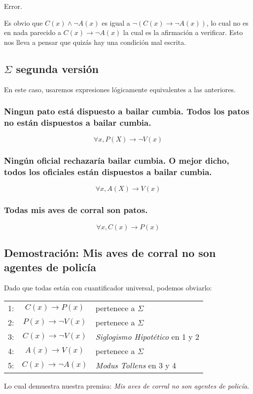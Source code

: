 Error.

Es obvio que $C(x)  \wedge \neg A(x)$ es igual a $\neg (C(x) \rightarrow \neg A(x))$, lo cual no es en nada parecido a $C(x) \rightarrow \neg A(x)$ la cual es la afirmación a verificar. Esto nos lleva a pensar que quizás hay una condición mal escrita.



\subsection{$\Sigma$ segunda versión}

En este caso, usaremos expresiones lógicamente equivalentes a las anteriores.

\subsubsection{Ningun pato está dispuesto a bailar cumbia. Todos los patos no están dispuestos a bailar cumbia.}
\begin{equation}
\forall x, P(X) \rightarrow \neg V(x)
\end{equation}\label{PRED:2_1}

\subsubsection{Ningún oficial rechazaría bailar cumbia. O mejor dicho, todos los oficiales están dispuestos a bailar cumbia.}
\begin{equation}
\forall x, A(X) \rightarrow V(x)
\end{equation}\label{PRED:2_1}


\subsubsection{Todas mis aves de corral son patos.} 
\begin{equation}
\forall x, C(x)  \rightarrow P(x)
\end{equation}\label{PRED:3_1}

\subsection{Demostración: Mis aves de corral no son agentes de policía}
Dado que todas están con cuantificador universal, podemos obviarlo:\\

\begin{tabular}{ c  c  l }
1:& $C(x) \rightarrow P(x)$ & pertenece a $\Sigma$\\
2:& $P(x) \rightarrow \neg V(x)$ & pertenece a $\Sigma$\\
3:& $C(x) \rightarrow \neg V(x)$ & \textit{Siglogismo Hipotético} en 1 y 2\\
4:& $A(x) \rightarrow V(x)$ & pertenece a $\Sigma$\\
5:& $C(x) \rightarrow \neg A(x)$ & \textit{Modus Tollens} en 3 y 4
\end{tabular}

Lo cual demuestra nuestra premisa: \textit{Mis aves de corral no son agentes de policía}.
